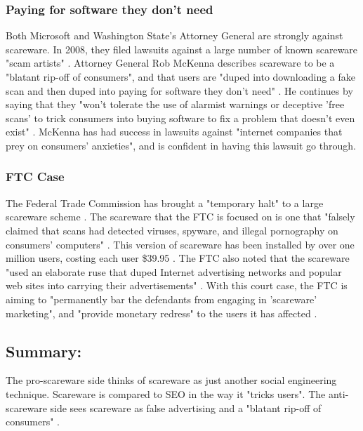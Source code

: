 \documentclass[11pt]{article}
\begin{document}
\begin{multicols}{2}
\subsubsection{Paying for software they don't need}
Both Microsoft and Washington State's Attorney General are strongly against scareware. In 2008, they filed lawsuits against a large number of known scareware "scam artists" \cite{bbcfighting}. Attorney General Rob McKenna describes scareware to be a "blatant rip-off of consumers", and that users are "duped into downloading a fake scan and then duped into paying for software they don't need" \cite{bbcfighting}. He continues by saying that they "won't tolerate the use of alarmist warnings or deceptive 'free scans' to trick consumers into buying software to fix a problem that doesn't even exist" \cite{bbcfighting}. McKenna has had success in lawsuits against "internet companies that prey on consumers' anxieties", and is confident in having this lawsuit go through.\cite{bbcfighting}
\subsubsection{FTC Case}
The Federal Trade Commission has brought a "temporary halt" to a large scareware scheme \cite{ftccourtcase}. The scareware that the FTC is focused on is one that "falsely claimed that scans had detected viruses, spyware, and illegal pornography on consumers' computers" \cite{ftccourtcase}. This version of scareware has been installed by over one million users, costing each user \$39.95 \cite{pcworld8.2million}. The FTC also noted that the scareware "used an elaborate ruse that duped Internet advertising networks and popular web sites into carrying their advertisements" \cite{ftccourtcase}. With this court case, the FTC is aiming to "permanently bar the defendants from engaging in 'scareware' marketing", and "provide monetary redress" to the users it has affected \cite{ftccourtcase}.
\subsection{Summary:}
The pro-scareware side thinks of scareware as just another social engineering technique. Scareware is compared to SEO in the way it "tricks users"\cite{malwareblogfakeav}. The anti-scareware side sees scareware as false advertising and a "blatant rip-off of consumers" \cite{bbcfighting}.


\end{multicols}
\end{document}
